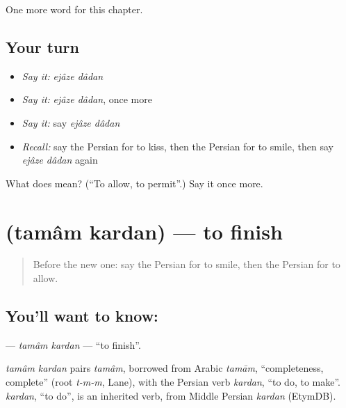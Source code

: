 \begin{grammarlens}[title={What you've built}]
One more word for this chapter.
\end{grammarlens}

\subsection*{Your turn}
\begin{itemize}
\raggedright
  \item \emph{Say it:} \emph{ejâze dâdan}
  \item \emph{Say it:} \emph{ejâze dâdan}, once more
  \item \emph{Say it:} say \emph{ejâze dâdan}
  \item \emph{Recall:} say the Persian for to kiss, then the Persian for to smile, then say \emph{ejâze dâdan} again
\end{itemize}

\begin{tcolorbox}[breakable,colback=teal!4,colframe=teal!35!black,title={Before you move on}]
What does   mean? (\textquotedblleft{}To allow, to permit\textquotedblright{}.) Say it once more.
\end{tcolorbox}
\section[\texorpdfstring{\fa{تمام} \fa{کردن} (tamâm kardan)}{تمام کردن (tamâm kardan)}]{  (tamâm kardan) — to finish}

\label{lesson:FA-C220-tamam-kardan}



\begin{quote}
Before the new one: say the Persian for to smile, then the Persian for to allow.
\end{quote}

\subsection*{You'll want to know:  }
\textbf{ } — \emph{tamâm kardan} — \textquotedblleft{}to finish\textquotedblright{}.

\begin{cousinweb}
\emph{tamâm kardan} pairs \emph{tamâm}, borrowed from Arabic \emph{tamām}, \textquotedblleft{}completeness, complete\textquotedblright{} (root \emph{t-m-m}, Lane), with the Persian verb \emph{kardan}, \textquotedblleft{}to do, to make\textquotedblright{}. \emph{kardan}, \textquotedblleft{}to do\textquotedblright{}, is an inherited verb, from Middle Persian \emph{kardan} (EtymDB).
\end{cousinweb}

